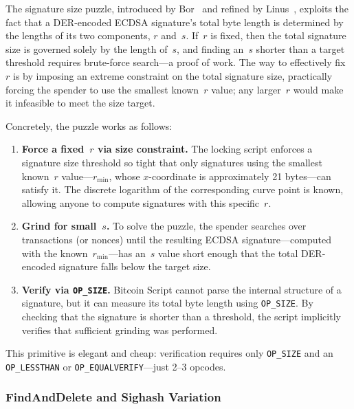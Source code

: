 \documentclass[11pt, a4paper]{article}
\begin{document}
The signature size puzzle, introduced by Bor~\cite{borco2024} and refined by Linus~\cite{linus2024binohash}, exploits the fact that a DER-encoded ECDSA signature's total byte length is determined by the lengths of its two components, $r$ and~$s$. If~$r$ is fixed, then the total signature size is governed solely by the length of~$s$, and finding an~$s$ shorter than a target threshold requires brute-force search---a proof of work. The way to effectively fix~$r$ is by imposing an extreme constraint on the total signature size, practically forcing the spender to use the smallest known~$r$ value; any larger~$r$ would make it infeasible to meet the size target.

Concretely, the puzzle works as follows:

\begin{enumerate}
    \item \textbf{Force a fixed~$r$ via size constraint.} The locking script enforces a signature size threshold so tight that only signatures using the smallest known~$r$ value---$r_{\min}$, whose $x$-coordinate is approximately 21 bytes---can satisfy it. The discrete logarithm of the corresponding curve point is known, allowing anyone to compute signatures with this specific~$r$.

    \item \textbf{Grind for small~$s$.} To solve the puzzle, the spender searches over transactions (or nonces) until the resulting ECDSA signature---computed with the known~$r_{\min}$---has an~$s$ value short enough that the total DER-encoded signature falls below the target size.

    \item \textbf{Verify via \texttt{OP\_SIZE}.} Bitcoin Script cannot parse the internal structure of a signature, but it can measure its total byte length using \texttt{OP\_SIZE}. By checking that the signature is shorter than a threshold, the script implicitly verifies that sufficient grinding was performed.
\end{enumerate}

This primitive is elegant and cheap: verification requires only \texttt{OP\_SIZE} and an \texttt{OP\_LESSTHAN} or \texttt{OP\_EQUALVERIFY}---just 2--3 opcodes.

\subsubsection{FindAndDelete and Sighash Variation}
\label{sec:findanddelete}
\end{document}
